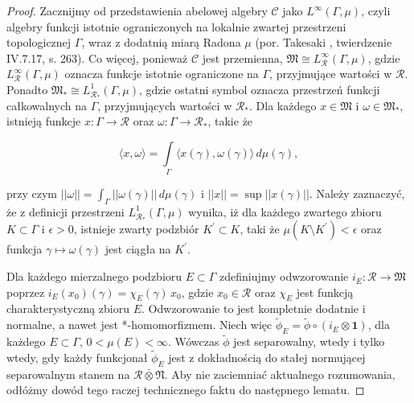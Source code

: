 \begin{proof}
Zacznijmy od przedstawienia abelowej algebry $\mathcal{C}$ jako
$L^{\infty}(\Gamma, \mu)$, czyli algebry funkcji istotnie ograniczonych
na lokalnie zwartej przestrzeni topologicznej $\Gamma$,
wraz z dodatnią miarą Radona $\mu$
(por. Takesaki \cite{Takesaki1}, twierdzenie IV.7.17, s. 263).
Co więcej, ponieważ $\mathcal{C}$ jest przemienna,
$\mathfrak{M} \cong L^{\infty}_{\mathcal{R}}(\Gamma, \mu)$,
gdzie $L^{\infty}_{\mathcal{R}}(\Gamma, \mu)$  oznacza
funkcje istotnie ograniczone na $\Gamma$, przyjmujące wartości w $\mathcal{R}$.
Ponadto $\mathfrak{M}_{*} \cong L^{1}_{\mathcal{R}_{*}}(\Gamma, \mu)$,
gdzie ostatni symbol oznacza
przestrzeń funkcji całkowalnych na $\Gamma$, przyjmujących wartości w $\mathcal{R}_{*}$.
Dla każdego $x \in \mathfrak{M}$ i $\omega \in \mathfrak{M}_{*}$,
istnieją funkcje $x:\Gamma\to\mathcal{R}$ oraz
$\omega:\Gamma\to\mathcal{R}_{*}$, takie że
\begin{linenomath*}
 \begin{equation}
\langle x, \omega \rangle =\int \limits_{\Gamma}
\langle x(\gamma), \omega(\gamma) \rangle \, d \mu(\gamma),
 \end{equation}
\end{linenomath*}
przy czym $||\omega|| = \int_{\Gamma} ||\omega(\gamma)|| \, d \mu(\gamma)$
i $||x|| = \sup || x(\gamma) ||$.
Należy zaznaczyć, że z definicji przestrzeni $L^{1}_{\mathcal{R}_{*}}(\Gamma, \mu)$
wynika, iż dla każdego zwartego zbioru
$K \subset \Gamma$ i $\epsilon >0$,
istnieje zwarty podzbiór $K^{'} \subset K$,
taki że $\mu (K \setminus K^{'}) < \epsilon$
oraz funkcja $\gamma \mapsto \omega(\gamma)$ jest ciągła na $K^{'}$.

Dla każdego mierzalnego podzbioru $E \subset \Gamma$
zdefiniujmy odwzorowanie
$i_{E}: \mathcal{R} \rightarrow \mathfrak{M}$ poprzez
$i_{E}(x_{0})(\gamma) = \chi_{E}(\gamma) \, x_{0}$,
gdzie $x_{0} \in \mathcal{R}$
oraz $\chi_{E}$ jest funkcją charakterystyczną zbioru $E$.
Odwzorowanie to jest kompletnie dodatnie i normalne,
a nawet jest *-homomorfizmem.
Niech więc $\tilde{\phi}_{E} = \tilde{\phi} \circ (i_{E} \otimes \mathbf{1})$,
dla każdego $E \subset \Gamma$, $0<\mu(E)<\infty$.
Wówczas $\tilde{\phi}$ jest separowalny, wtedy i tylko wtedy, gdy
każdy funkcjonał $\tilde{\phi}_{E}$ jest z dokładnością do stałej
normującej separowalnym stanem na $\mathcal{R} \bar{\otimes} \mathfrak{N}$.
Aby nie zaciemniać aktualnego rozumowania,
odłóżmy dowód tego raczej technicznego faktu do następnego lematu.


\end{proof}
